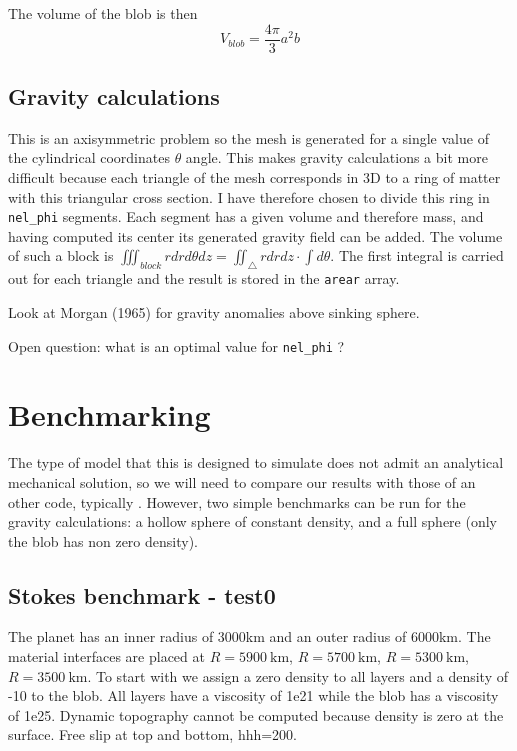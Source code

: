 The volume of the blob is then 
\[
V_{blob} = \frac{4\pi}{3}a^2b
\]


 
\subsection*{Gravity calculations}

This is an axisymmetric problem so the mesh is generated for a single 
value of the cylindrical coordinates $\theta$ angle. 
This makes gravity calculations a bit more difficult because each triangle 
of the mesh corresponds in 3D to a ring of matter with this triangular cross section. 
I have therefore chosen to divide this ring in {\tt nel\_phi} segments. 
Each segment has a given volume and therefore mass, 
and having computed its center its generated gravity field can be added. 
The volume of such a block is 
$\iiint_{block} r dr d\theta dz =\iint_\triangle rdrdz \cdot \int d\theta$.  
The first integral is carried out for each triangle and the result is stored 
in the {\tt arear} array. 


Look at Morgan (1965) \cite{morg65} for gravity anomalies above sinking sphere. 

Open question: what is an optimal value for {\tt nel\_phi} ?








\section*{Benchmarking}

The type of model that this \stone is designed to simulate does not admit an 
analytical mechanical solution, so we will need to compare our results with those 
of an other code, typically \aspect. 
However, two simple benchmarks can be run for the gravity calculations: 
a hollow sphere of constant density, and a full sphere (only the blob has non zero density).




\newpage
\subsection*{Stokes benchmark - test0}

The planet has an inner radius of 3000km and an outer radius of 6000km.
The material interfaces are placed at $R=5900~\si{\km}$, $R=5700~\si{\km}$, $R=5300~\si{\km}$, $R=3500~\si{\km}$.
To start with we assign a zero density to all layers and a density of -10 to the blob. 
All layers have a viscosity of 1e21 while the blob has a viscosity of 1e25.
Dynamic topography cannot be computed because density is zero at the surface.
Free slip at top and bottom, hhh=200.

